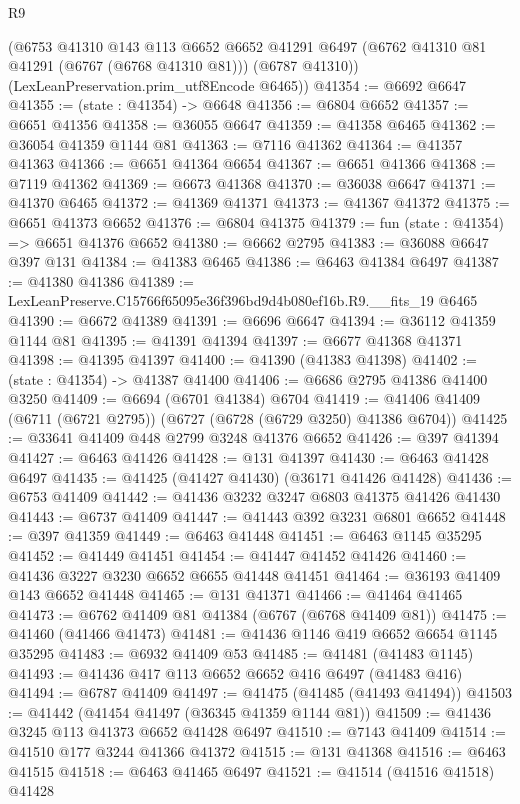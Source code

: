 \begin{lexlean}{R9}
\begin{coremodule}
      (@6753
        @41310
        @143
        @113
        @6652
        @6652
        @41291
        @6497
        (@6762 @41310 @81 @41291 (@6767 (@6768 @41310 @81)))
        (@6787 @41310))
      (LexLeanPreservation.prim_utf8Encode @6465))
@41354 := @6692 @6647
@41355 := (state : @41354) -> @6648
@41356 := @6804 @6652
@41357 := @6651 @41356
@41358 := @36055 @6647
@41359 := @41358 @6465
@41362 := @36054 @41359 @1144 @81
@41363 := @7116 @41362
@41364 := @41357 @41363
@41366 := @6651 @41364 @6654
@41367 := @6651 @41366
@41368 := @7119 @41362
@41369 := @6673 @41368
@41370 := @36038 @6647
@41371 := @41370 @6465
@41372 := @41369 @41371
@41373 := @41367 @41372
@41375 := @6651 @41373 @6652
@41376 := @6804 @41375
@41379 := fun (state : @41354) => @6651 @41376 @6652
@41380 := @6662 @2795
@41383 := @36088 @6647 @397 @131
@41384 := @41383 @6465
@41386 := @6463 @41384 @6497
@41387 := @41380 @41386
@41389 := LexLeanPreserve.C15766f65095e36f396bd9d4b080ef16b.R9.__fits_19 @6465
@41390 := @6672 @41389
@41391 := @6696 @6647
@41394 := @36112 @41359 @1144 @81
@41395 := @41391 @41394
@41397 := @6677 @41368 @41371
@41398 := @41395 @41397
@41400 := @41390 (@41383 @41398)
@41402 := (state : @41354) -> @41387 @41400
@41406 := @6686 @2795 @41386 @41400 @3250
@41409 := @6694 (@6701 @41384) @6704
@41419 := @41406 @41409 (@6711 (@6721 @2795)) (@6727 (@6728 (@6729 @3250) @41386 @6704))
@41425 := @33641 @41409 @448 @2799 @3248 @41376 @6652
@41426 := @397 @41394
@41427 := @6463 @41426
@41428 := @131 @41397
@41430 := @6463 @41428 @6497
@41435 := @41425 (@41427 @41430) (@36171 @41426 @41428)
@41436 := @6753 @41409
@41442 := @41436 @3232 @3247 @6803 @41375 @41426 @41430
@41443 := @6737 @41409
@41447 := @41443 @392 @3231 @6801 @6652
@41448 := @397 @41359
@41449 := @6463 @41448
@41451 := @6463 @1145 @35295
@41452 := @41449 @41451
@41454 := @41447 @41452 @41426
@41460 := @41436 @3227 @3230 @6652 @6655 @41448 @41451
@41464 := @36193 @41409 @143 @6652 @41448
@41465 := @131 @41371
@41466 := @41464 @41465
@41473 := @6762 @41409 @81 @41384 (@6767 (@6768 @41409 @81))
@41475 := @41460 (@41466 @41473)
@41481 := @41436 @1146 @419 @6652 @6654 @1145 @35295
@41483 := @6932 @41409 @53
@41485 := @41481 (@41483 @1145)
@41493 := @41436 @417 @113 @6652 @6652 @416 @6497 (@41483 @416)
@41494 := @6787 @41409
@41497 := @41475 (@41485 (@41493 @41494))
@41503 := @41442 (@41454 @41497 (@36345 @41359 @1144 @81))
@41509 := @41436 @3245 @113 @41373 @6652 @41428 @6497
@41510 := @7143 @41409
@41514 := @41510 @177 @3244 @41366 @41372
@41515 := @131 @41368
@41516 := @6463 @41515
@41518 := @6463 @41465 @6497
@41521 := @41514 (@41516 @41518) @41428

\end{coremodule}
\end{lexlean}
